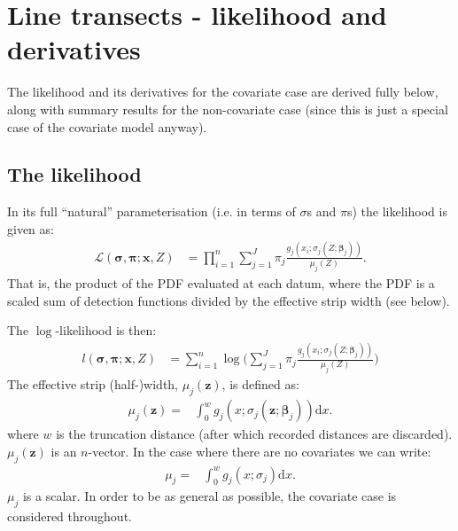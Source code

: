 \newcommand{\erf}{\text{Erf}}
\newcommand{\palphaj}{\frac{\partial}{\partial \alpha_{j*}}}
\newcommand{\pbetajk}{\frac{\partial}{\partial \beta_{j*k*}}}
\newcommand{\nuj}{\nu_j(\bm{z}^{(j)})}
\newcommand{\nujs}{\nu_{j*}(\bm{z}^{(j*)})}
\newcommand{\zijk}{z_{ik}^{(j)}}
\newcommand{\zijkss}{z_{ik*}^{(j*)}}
\newcommand{\zj}{\bm{z}_j}
\newcommand{\zjs}{\bm{z}_{j*}}
\newcommand{\zJ}{\bm{z}_J}

\section{Line transects - likelihood and derivatives}

The likelihood and its derivatives for the covariate case are derived fully below, along with summary results for the non-covariate case (since this is just a special case of the covariate model anyway).

\subsection{The likelihood}

In its full ``natural'' parameterisation (i.e. in terms of $\sigma$s and $\pi$s) the likelihood is given as:
\begin{align*}
\mathcal{L}(\bm{\sigma},\bm{\pi}; \bm{x}, Z) &= \prod_{i=1}^n \sum_{j=1}^J \pi_j \frac{g_j(x_i; \sigma_j(Z;\bm{\beta}_j))}{\mu_j(Z)}.
\end{align*}
That is, the product of the PDF evaluated at each datum, where the PDF is a scaled sum of detection functions divided by the effective strip width (see below). 

The $\log$-likelihood is then:
\begin{align*}
l(\bm{\sigma},\bm{\pi}; \bm{x}, Z) &= \sum_{i=1}^n \log\Big(\sum_{j=1}^J \pi_j \frac{g_j(x_i;\sigma_j(Z;\bm{\beta}_j))}{\mu_j(Z)}\Big)
\end{align*}
The effective strip (half-)width, $\mu_j(\bm{z})$, is defined as:
\begin{align*}
\mu_j(\bm{z})=& \int_0^w g_j(x;\sigma_j(\bm{z};\bm{\beta}_j)) \text{d}x.
\end{align*}
where $w$ is the truncation distance (after which recorded distances are discarded). $\mu_j(\bm{z})$ is an $n$-vector. In the case where there are no covariates we can write:
\begin{align*}
\mu_j=& \int_0^w g_j(x;\sigma_j) \text{d}x.
\end{align*}
$\mu_j$ is a scalar.
In order to be as general as possible, the covariate case is considered throughout.

